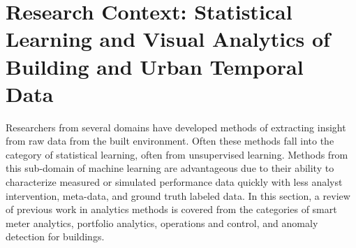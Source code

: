 \section{Research Context: Statistical Learning and Visual Analytics of Building and Urban Temporal Data}
\label{sec:litreview}

Researchers from several domains have developed methods of extracting insight from raw data from the built environment. Often these methods fall into the category of statistical learning, often from unsupervised learning. Methods from this sub-domain of machine learning are advantageous due to their ability to characterize measured or simulated performance data quickly with less analyst intervention, meta-data, and ground truth labeled data. In this section, a review of previous work in analytics methods is covered from the categories of smart meter analytics, portfolio analytics, operations and control, and anomaly detection for buildings. 